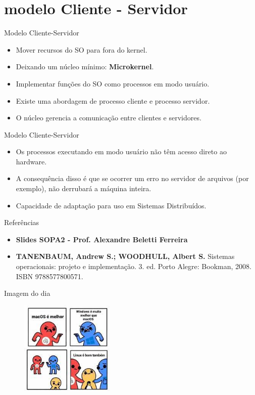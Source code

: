 \documentclass{beamer}
\begin{document}
\section{modelo Cliente - Servidor}
\begin{frame}{Modelo Cliente-Servidor}
    \begin{itemize}
        \item Mover recursos do SO para fora do kernel.
        \item Deixando um núcleo mínimo: \textbf{Microkernel}.
        \item Implementar funções do SO como processos em modo usuário.
        \item Existe uma abordagem de processo cliente e processo servidor.
        \item O núcleo gerencia a comunicação entre clientes e servidores.
    \end{itemize}
\end{frame}
\begin{frame}{Modelo Cliente-Servidor}
    \begin{itemize}
        \item Os processos executando em modo usuário não têm acesso direto ao hardware.
        \item A consequência disso é que se ocorrer um erro no servidor de arquivos (por exemplo), não derrubará a máquina inteira.
        \item Capacidade de adaptação para uso em Sistemas Distribuídos.
    \end{itemize}
\end{frame}


\begin{frame}{Referências }\justifying
      \begin{itemize}
            \item \textbf{Slides SOPA2 - Prof. Alexandre Beletti Ferreira}
            \item \textbf{TANENBAUM, Andrew S.; WOODHULL, Albert S.} Sistemas operacionais: projeto e implementação. 3. ed. Porto Alegre: Bookman, 2008. ISBN 9788577800571.
      \end{itemize}
\end{frame}


\begin{frame}[fragile]{Imagem do dia}

    \begin{figure}[H]
        \centerline{\includegraphics[width=0.4\textwidth]{assets/imagem-do-dia/sope-02.jpeg}}
        
    \end{figure}
\end{frame}

\backmatter
\end{document}
